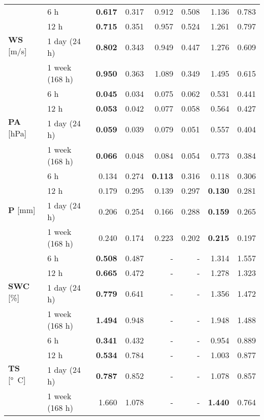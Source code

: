 \begin{table}
\begin{tabular}{p{2.1cm}l|rr|rr|rr}
\cline{1-8}
\multirow[c]{4}{*}{\parbox{2.1cm}{\textbf{WS} [\si{m/s}]}} & 6 h & \bfseries 0.617 & 0.317 & 0.912 & 0.508 & 1.136 & 0.783 \\
 & 12 h & \bfseries 0.715 & 0.351 & 0.957 & 0.524 & 1.261 & 0.797 \\
 & 1 day (24 h) & \bfseries 0.802 & 0.343 & 0.949 & 0.447 & 1.276 & 0.609 \\
 & 1 week (168 h) & \bfseries 0.950 & 0.363 & 1.089 & 0.349 & 1.495 & 0.615 \\
\cline{1-8}
\multirow[c]{4}{*}{\parbox{2.1cm}{\textbf{PA} [\si{hPa}]}} & 6 h & \bfseries 0.045 & 0.034 & 0.075 & 0.062 & 0.531 & 0.441 \\
 & 12 h & \bfseries 0.053 & 0.042 & 0.077 & 0.058 & 0.564 & 0.427 \\
 & 1 day (24 h) & \bfseries 0.059 & 0.039 & 0.079 & 0.051 & 0.557 & 0.404 \\
 & 1 week (168 h) & \bfseries 0.066 & 0.048 & 0.084 & 0.054 & 0.773 & 0.384 \\
\cline{1-8}
\multirow[c]{4}{*}{\parbox{2.1cm}{\textbf{P} [\si{mm}]}} & 6 h & 0.134 & 0.274 & \bfseries 0.113 & 0.316 & 0.118 & 0.306 \\
 & 12 h & 0.179 & 0.295 & 0.139 & 0.297 & \bfseries 0.130 & 0.281 \\
 & 1 day (24 h) & 0.206 & 0.254 & 0.166 & 0.288 & \bfseries 0.159 & 0.265 \\
 & 1 week (168 h) & 0.240 & 0.174 & 0.223 & 0.202 & \bfseries 0.215 & 0.197 \\
\cline{1-8}
\multirow[c]{4}{*}{\parbox{2.1cm}{\textbf{SWC} [\si{\%}]}} & 6 h & \bfseries 0.508 & 0.487 & - & - & 1.314 & 1.557 \\
 & 12 h & \bfseries 0.665 & 0.472 & - & - & 1.278 & 1.323 \\
 & 1 day (24 h) & \bfseries 0.779 & 0.641 & - & - & 1.356 & 1.472 \\
 & 1 week (168 h) & \bfseries 1.494 & 0.948 & - & - & 1.948 & 1.488 \\
\cline{1-8}
\multirow[c]{4}{*}{\parbox{2.1cm}{\textbf{TS} [\si{°C}]}} & 6 h & \bfseries 0.341 & 0.432 & - & - & 0.954 & 0.889 \\
 & 12 h & \bfseries 0.534 & 0.784 & - & - & 1.003 & 0.877 \\
 & 1 day (24 h) & \bfseries 0.787 & 0.852 & - & - & 1.078 & 0.857 \\
 & 1 week (168 h) & 1.660 & 1.078 & - & - & \bfseries 1.440 & 0.764 \\
\cline{1-8}
\bottomrule
\end{tabular}
\end{table}
